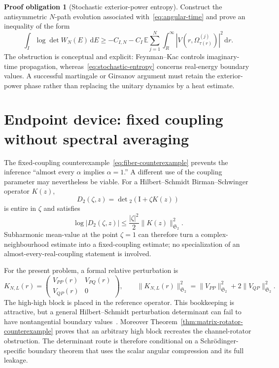\documentclass[11pt]{article}
\newcommand{\HS}{\mathfrak S_2}
\newcommand{\Id}{\mathrm I}
\newcommand{\dd}{\,\mathrm d}
\theoremstyle{definition}
\newtheorem{problem}[theorem]{Proof obligation}
\theoremstyle{remark}
\begin{document}
\begin{problem}[Stochastic exterior-power entropy]\label{prob:stochastic}
Construct the antisymmetric $N$-path evolution associated with~\eqref{eq:angular-time} and prove an inequality of the form
\begin{equation}
 \int_I\log\det W_N(E)\dd E
 \geq-C_{I,N}
 -C_I\,\mathbb E\sum_{j=1}^N
  \int_R^\infty|V(r,\Omega_{\tau(r)}^{(j)})|^2\dd r.
 \label{eq:stochastic-entropy}
\end{equation}
The obstruction is conceptual and explicit: Feynman--Kac controls imaginary-time propagation, whereas~\eqref{eq:stochastic-entropy} concerns real-energy boundary values.  A successful martingale or Girsanov argument must retain the exterior-power phase rather than replacing the unitary dynamics by a heat estimate.
\end{problem}

\section{Endpoint device: fixed coupling without spectral averaging}

The fixed-coupling counterexample~\eqref{eq:fiber-counterexample} prevents the inference ``almost every $\alpha$ implies $\alpha=1$.''  A different use of the coupling parameter may nevertheless be viable.  For a Hilbert--Schmidt Birman--Schwinger operator $K(z)$,
\begin{equation}
 D_2(\zeta,z)=\det{}_2(\Id+\zeta K(z))
 \label{eq:det2}
\end{equation}
is entire in $\zeta$ and satisfies
\begin{equation}
 \log|D_2(\zeta,z)|
 \leq\frac{|\zeta|^2}{2}\|K(z)\|_{\HS}^2.
 \label{eq:det2-growth}
\end{equation}
Subharmonic mean-value at the point $\zeta=1$ can therefore turn a complex-neighbourhood estimate into a fixed-coupling estimate; no specialization of an almost-every-real-coupling statement is involved.

For the present problem, a formal relative perturbation is
\begin{equation}
 K_{N,L}(r)=
 \begin{pmatrix}
 V_{PP}(r)&V_{PQ}(r)\\
 V_{QP}(r)&0
 \end{pmatrix},
 \qquad
 \|K_{N,L}(r)\|_{\HS}^2
 =\|V_{PP}\|_{\HS}^2+2\|V_{QP}\|_{\HS}^2.
 \label{eq:relative-K}
\end{equation}
The high-high block is placed in the reference operator.  This bookkeeping is attractive, but a general Hilbert--Schmidt perturbation determinant can fail to have nontangential boundary values~\cite{GPS2007}.  Moreover Theorem~\ref{thm:matrix-rotator-counterexample} proves that an arbitrary high block recreates the channel-rotator obstruction.  The determinant route is therefore conditional on a Schr\"odinger-specific boundary theorem that uses the scalar angular compression and its full leakage.
\end{document}
